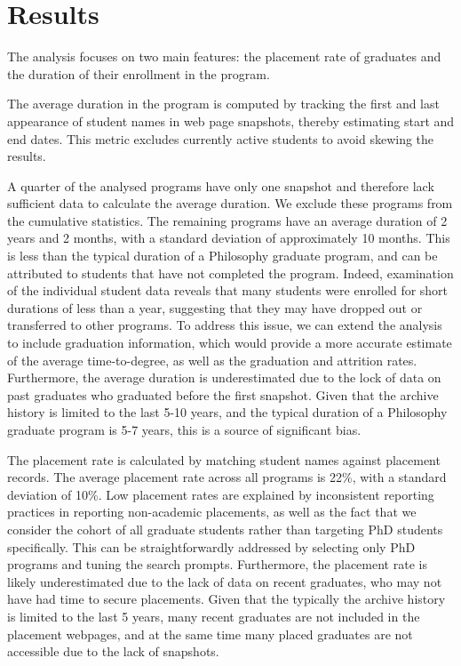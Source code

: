 \documentclass[11pt]{article}
\begin{document}
\section{Results}

    The analysis focuses on two main features: the placement rate of graduates and the duration of their enrollment in the program.

    The average duration in the program is computed by tracking the first and last appearance of student names in web page snapshots, thereby estimating start and end dates. This metric excludes currently active students to avoid skewing the results.

    A quarter of the analysed programs have only one snapshot and therefore lack sufficient data to calculate the average duration.
    We exclude these programs from the cumulative statistics.
    The remaining programs have an average duration of 2 years and 2 months, with a standard deviation of approximately 10 months.
    This is less than the typical duration of a Philosophy graduate program, and can be attributed to students that have not completed the program.
    Indeed, examination of the individual student data reveals that many students were enrolled for short durations of less than a year, suggesting that they may have dropped out or transferred to other programs.
    To address this issue, we can extend the analysis to include graduation information, which would provide a more accurate estimate of the average time-to-degree, as well as the graduation and attrition rates.
    Furthermore, the average duration is underestimated due to the lock of data on past graduates who graduated before the first snapshot.
    Given that the archive history is limited to the last 5-10 years, and the typical duration of a Philosophy graduate program is 5-7 years, this is a source of significant bias.

    The placement rate is calculated by matching student names against placement records.
    The average placement rate across all programs is 22\%, with a standard deviation of 10\%.
    Low placement rates are explained by inconsistent reporting practices in reporting non-academic placements, as well as the fact that we consider the cohort of all graduate students rather than targeting PhD students specifically.
    This can be straightforwardly addressed by selecting only PhD programs and tuning the search prompts.
    Furthermore, the placement rate is likely underestimated due to the lack of data on recent graduates, who may not have had time to secure placements.
    Given that the typically the archive history is limited to the last 5 years, many recent graduates are not included in the placement webpages, and at the same time many placed graduates are not accessible due to the lack of snapshots.
\end{document}
